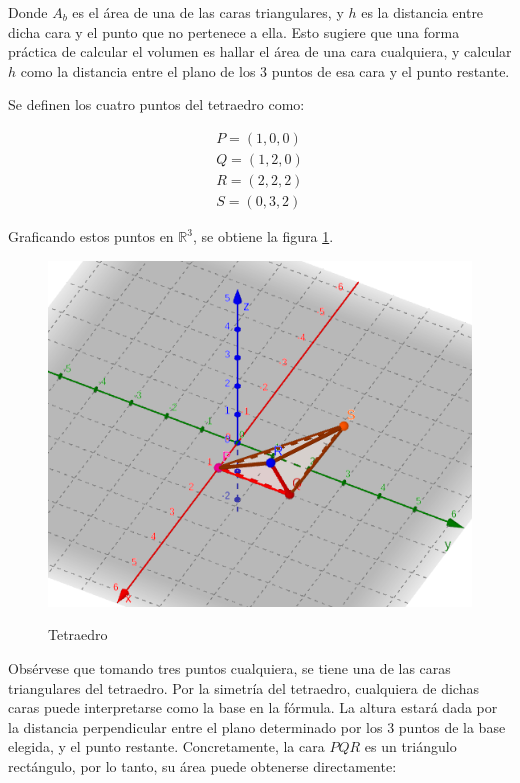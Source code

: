 \documentclass{article}
\renewcommand{\Bbb}{\mathbb}
\begin{document}
Donde $A_b$ es el área de una de las caras triangulares, y $h$ es la distancia entre dicha cara y el punto que no pertenece a ella. Esto sugiere que una forma práctica de calcular el volumen es hallar el área de una cara cualquiera, y calcular $h$ como la distancia entre el plano de los 3 puntos de esa cara y el punto restante.

Se definen los cuatro puntos del tetraedro como:

\begin{align}
P = (1, 0, 0) \\
Q = (1, 2, 0) \\
R = (2, 2, 2) \\
S = (0, 3, 2)
\end{align}

Graficando estos puntos en $\Bbb R^3$, se obtiene la figura \ref{fig:1-8-c}.

\begin{figure}[ht]
\caption{Tetraedro}
\includegraphics[scale=0.6]{img/ejercicios/1/8-c.png} 
\centering
\label{fig:1-8-c}
\end{figure}

Obsérvese que tomando tres puntos cualquiera, se tiene una de las caras triangulares del tetraedro. Por la simetría del tetraedro, cualquiera de dichas caras puede interpretarse como la base en la fórmula. La altura estará dada por la distancia perpendicular entre el plano determinado por los 3 puntos de la base elegida, y el punto restante. Concretamente, la cara $PQR$ es un triángulo rectángulo, por lo tanto, su área puede obtenerse directamente:
\end{document}
